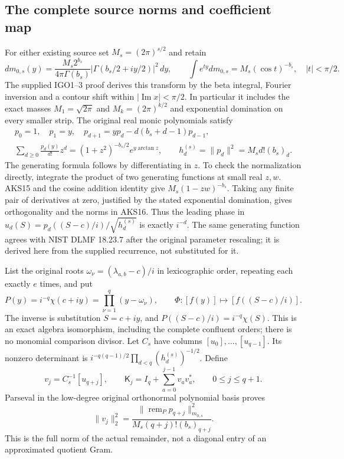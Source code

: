 \documentclass[11pt,a4paper]{article}
\begin{document}
\subsection{The complete source norms and coefficient map}
For either existing source set $M_s=(2\pi)^{s/2}$ and retain
\[
 dm_{0,s}(y)=\frac{M_s2^{b_s}}{4\pi\Gamma(b_s)}
           |\Gamma(b_s/2+iy/2)|^2\,dy,\qquad
 \int e^{ty}dm_{0,s}=M_s(\cos t)^{-b_s},\quad |t|<\pi/2.
 \tag{AKS15}
\]
The supplied IGO1--3 proof derives this transform by the beta integral,
Fourier inversion and a contour shift within $|\operatorname{Im}x|<\pi/2$.
In particular it includes the exact masses $M_1=\sqrt{2\pi}$ and
$M_k=(2\pi)^{k/2}$ and exponential domination on every smaller strip.
The original real monic polynomials satisfy
\[
\begin{gathered}
 p_0=1,\quad p_1=y,\quad
 p_{d+1}=yp_d-d(b_s+d-1)p_{d-1},\\
 \sum_{d\ge0}\frac{p_d(y)}{d!}z^d
      =(1+z^2)^{-b_s/2}e^{y\arctan z},\qquad
 h_d^{(s)}=\|p_d\|^2=M_s d!(b_s)_d.
\end{gathered}\tag{AKS16}
\]
The generating formula follows by differentiating in $z$. To check the
normalization directly, integrate the product of two generating
functions at small real $z,w$. AKS15 and the cosine addition identity
give $M_s(1-zw)^{-b_s}$. Taking any finite pair of derivatives at zero,
justified by the stated exponential domination, gives orthogonality and
the norms in AKS16. Thus the leading phase in
$u_d(S)=p_d((S-c)/i)/\sqrt{h_d^{(s)}}$ is exactly $i^{-d}$.
The same generating function agrees with NIST DLMF 18.23.7 after the
original parameter rescaling; it is derived here from the supplied
recurrence, not substituted for it.

List the original roots
$\omega_\nu=(\lambda_{a,b}-c)/i$ in lexicographic order, repeating each
exactly $e$ times, and put
\[
 P(y)=i^{-q}\chi(c+iy)=\prod_{\nu=1}^q(y-\omega_\nu),\qquad
 \Phi:[f(y)]\mapsto[f((S-c)/i)].
 \tag{AKS17}
\]
The inverse is substitution $S=c+iy$, and
$P((S-c)/i)=i^{-q}\chi(S)$. This is an exact algebra isomorphism, including
the complete confluent orders; there is no monomial comparison divisor.
Let $C_s$ have columns $[u_0],\ldots,[u_{q-1}]$. Its nonzero determinant
is $i^{-q(q-1)/2}\prod_{d<q}(h_d^{(s)})^{-1/2}$. Define
\[
 v_j=C_s^{-1}[u_{q+j}],\qquad
 \mathsf K_j=I_q+\sum_{a=0}^{j-1}v_av_a^*,\qquad 0\le j\le q+1.
 \tag{AKS18}
\]
Parseval in the low-degree original orthonormal polynomial basis proves
\[
 \|v_j\|_2^2=
 \frac{\|\operatorname{rem}_P p_{q+j}\|_{m_{0,s}}^2}
      {M_s(q+j)!(b_s)_{q+j}}.
 \tag{AKS19}
\]
This is the full norm of the actual remainder, not a diagonal entry of
an approximated quotient Gram.
\end{document}

